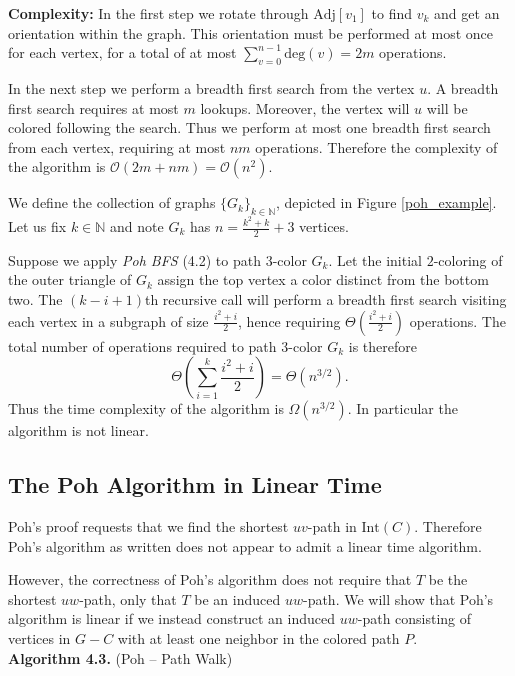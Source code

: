 \documentclass[letterpaper, 12pt]{article}
\theoremstyle{definition}
\theoremstyle{definition}
\theoremstyle{thm}
\theoremstyle{definition}
\begin{document}
\noindent\textbf{Complexity:} In the first step we rotate through
$\text{Adj}[v_1]$ to find $v_k$ and get an orientation within the graph. This
orientation must be performed at most once for each vertex, for a total of at
most $\sum_{v=0}^{n-1}\text{deg}(v)=2m$ operations.

In the next step we perform a breadth first search from the vertex $u$.
A breadth first search requires at most $m$ lookups. Moreover, the vertex will
$u$ will be colored following the search. Thus we perform at most one breadth
first search from each vertex, requiring at most $nm$ operations.
Therefore the complexity of the algorithm is $\mathcal{O}(2m + nm)
=\mathcal{O}(n^2)$.

We define the collection of graphs $\{G_k\}_{k\in\mathbb{N}}$, depicted in
Figure \ref{poh_example}. Let us fix $k\in\mathbb{N}$ and note $G_k$ has
$n=\frac{k^2+k}{2}+3$ vertices.

Suppose we apply \textit{Poh BFS} (4.2) to path $3$-color $G_k$.
Let the initial $2$-coloring of the outer triangle of $G_k$ assign the top
vertex a color distinct from the bottom two.
The $(k-i+1)$th recursive call will perform a breadth
first search visiting each vertex in a subgraph of size $\frac{i^2+i}{2}$,
hence requiring $\Theta(\frac{i^2+i}{2})$ operations. The total number
of operations required to path $3$-color $G_k$ is therefore
\[
    \Theta\left(\sum_{i=1}^k \frac{i^2+i}{2}\right)=\Theta(n^{3/2}).
\]
Thus the time complexity of the algorithm is $\Omega(n^{3/2})$. In
particular the algorithm is not linear.\\

\subsection{The Poh Algorithm in Linear Time}

Poh's proof requests that we find the shortest $uv$-path in $\text{Int}(C)$.
Therefore Poh's algorithm as written does not appear to admit a linear time
algorithm.

However, the correctness of Poh's algorithm does not require that $T$
be the shortest $uw$-path, only that $T$ be an induced $uw$-path. We will show
that Poh's algorithm is linear if we instead construct an induced $uw$-path
consisting of vertices in $G-C$ with at least one neighbor in the colored
path $P$.\\

\noindent\textbf{Algorithm 4.3.} (Poh -- Path Walk)
\end{document}
